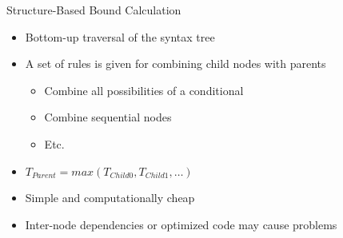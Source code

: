 \documentclass{beamer}
\begin{document}
\begin{frame}{Structure-Based Bound Calculation}
  \begin{itemize}
    \item Bottom-up traversal of the syntax tree
    \item A set of rules is given for combining child nodes with parents
      \begin{itemize}
        \item Combine all possibilities of a conditional
        \item Combine sequential nodes
        \item Etc.
      \end{itemize}
    \item $T_{Parent} = max(T_{Child0}, T_{Child1},\dots)$
    \item Simple and computationally cheap
    \item Inter-node dependencies or optimized code may cause problems
  \end{itemize}
\end{frame}
\end{document}
